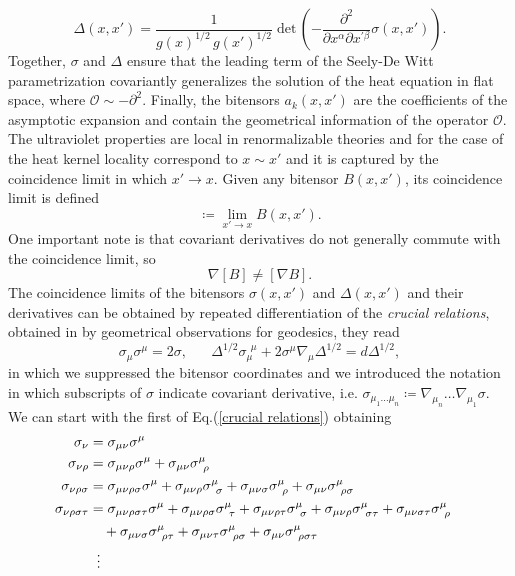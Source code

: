 \begin{equation}
    \Delta(x,x') = \frac{1}{g(x)^{1/2}\,g(x')^{1/2}}\;\text{det}\,\left(-\frac{\partial^2}{\partial x^\alpha \partial x^{'\beta}}\sigma(x,x')\right).
\end{equation}
Together, $\sigma$ and $\Delta$ ensure that the leading term of the Seely-De Witt parametrization covariantly generalizes the solution of the heat equation in flat space, where $\mathcal{O} \sim -\partial^2.$ Finally, the bitensors $a_k(x,x')$ are the coefficients of the asymptotic expansion and contain the geometrical information of the operator $\mathcal{O}$. The ultraviolet properties are local in renormalizable theories and for the case of the heat kernel locality correspond to $x \sim x'$ and it is captured by the coincidence limit in which $x' \xrightarrow{} x$. Given any bitensor $B(x,x')$, its coincidence limit is defined 
\begin{equation}
    [B] \coloneqq \lim_{x' \xrightarrow{} x} B(x,x').
\end{equation}
One important note is that covariant derivatives do not generally commute with the coincidence limit, so 
\begin{equation}
    \nabla  [B] \neq [\nabla B].
\end{equation}
The coincidence limits of the bitensors $\sigma(x,x')$ and $\Delta(x,x')$ and their derivatives can be obtained by repeated differentiation of the \emph{crucial relations}, obtained in \cite{DeWitt:1964mxt} by geometrical observations for geodesics, they read
\begin{equation}\label{crucial relations}
    \sigma_\mu \sigma^\mu = 2 \sigma,\;\;\;\;\;\; \Delta^{1/2} \sigma_\mu^{\;\,\mu} + 2 \sigma ^\mu \nabla_\mu \Delta^{1/2} = d \Delta^{1/2},
\end{equation}
in which we suppressed the bitensor coordinates and we introduced the notation in which subscripts of $\sigma$ indicate covariant derivative, i.e. $\sigma_{\mu_{1}\dots\mu_{n}} \coloneqq \nabla_{\mu_{n}}\dots\nabla_{\mu_{1}} \sigma$. We can start with the first of Eq.(\ref{crucial relations}) obtaining
\begin{align}
\sigma_{\nu} &= \sigma_{\mu \nu} \sigma^{\mu}\label{diff sigma 0}&&\\
\sigma_{\nu\rho} &= \sigma_{\mu\nu\rho}\sigma^\mu + \sigma_{\mu\nu} \sigma^{\mu}_{\;\,\rho}\label{diff sigma 1}&&\\
\sigma_{\nu\rho\sigma} &= \sigma_{\mu\nu\rho\sigma} \sigma^\mu + \sigma_{\mu\nu\rho} \sigma^\mu_{\,\;\sigma} + \sigma_{\mu\nu\sigma} \sigma^\mu_{\,\;\rho} +\sigma_{\mu\nu} \sigma^\mu_{\,\;\rho\sigma}\label{diff sigma 2}&&\\
\sigma_{\nu\rho\sigma\tau} &= \sigma_{\mu\nu\rho\sigma\tau} \sigma^\mu + \sigma_{\mu\nu\rho\sigma} \sigma^\mu_{\,\;\tau} + \sigma_{\mu\nu\rho\tau}\sigma^\mu_{\,\;\sigma} + \sigma_{\mu\nu\rho}\sigma^\mu_{\,\;\sigma\tau} + \sigma_{\mu\nu\sigma\tau}\sigma^\mu_{\,\;\rho}\label{diff sigma 3} \\
&\quad + \sigma_{\mu\nu\sigma}\sigma^\mu_{\,\;\rho\tau} +\sigma_{\mu\nu\tau} \sigma^\mu_{\,\;\rho\sigma} +\sigma_{\mu\nu}\sigma^\mu_{\,\;\rho\sigma\tau}\notag&&\\
&\;\;\vdots \notag
\end{align}
